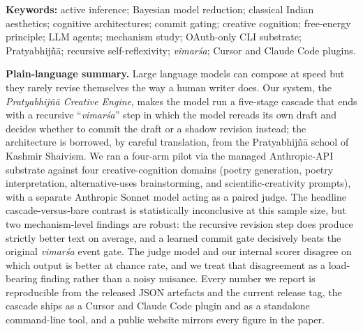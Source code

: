 \documentclass[11pt,a4paper]{article}
\newcommand{\iast}[1]{\textit{#1}}
\begin{document}
\medskip\noindent\textbf{Keywords:} active inference; Bayesian model reduction; classical Indian aesthetics; cognitive architectures; commit gating; creative cognition; free-energy principle; LLM agents; mechanism study; OAuth-only CLI substrate; Pratyabhij\~n\=a; recursive self-reflexivity; \iast{vimar\'sa}; Cursor and Claude Code plugins.

\medskip\noindent\textbf{Plain-language summary.} Large language models can compose at speed but they rarely revise themselves the way a human writer does. Our system, the \emph{Pratyabhij\~n\=a Creative Engine}, makes the model run a five-stage cascade that ends with a recursive ``\iast{vimar\'sa}'' step in which the model rereads its own draft and decides whether to commit the draft or a shadow revision instead; the architecture is borrowed, by careful translation, from the Pratyabhij\~n\=a school of Kashmir Shaivism. We ran a four-arm pilot via the managed Anthropic-API substrate against four creative-cognition domains (poetry generation, poetry interpretation, alternative-uses brainstorming, and scientific-creativity prompts), with a separate Anthropic Sonnet model acting as a paired judge. The headline cascade-versus-bare contrast is statistically inconclusive at this sample size, but two mechanism-level findings are robust: the recursive revision step does produce strictly better text on average, and a learned commit gate decisively beats the original \iast{vimar\'sa} event gate. The judge model and our internal scorer disagree on which output is better at chance rate, and we treat that disagreement as a load-bearing finding rather than a noisy nuisance. Every number we report is reproducible from the released JSON artefacts and the current release tag, the cascade ships as a Cursor and Claude Code plugin and as a standalone command-line tool, and a public website mirrors every figure in the paper.

















\appendix










\end{document}
